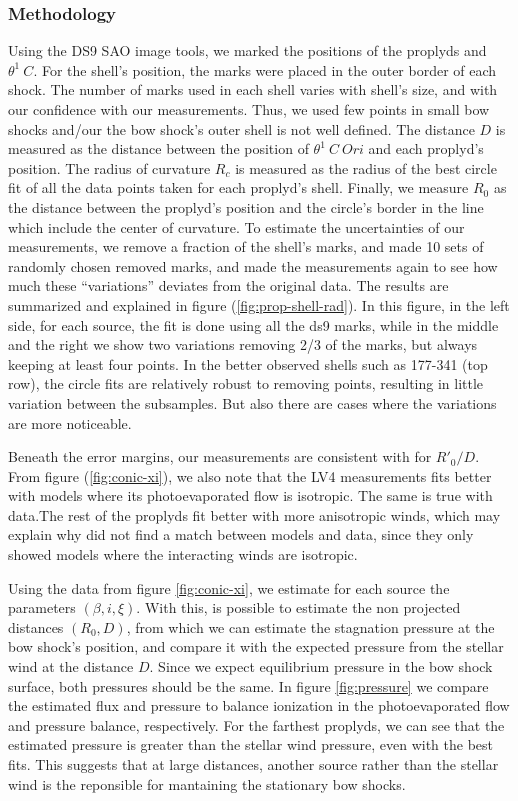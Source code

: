 \subsubsection{Methodology}
\label{sec:methodology}
Using the DS9 SAO image tools, we marked the positions of the proplyds and $\theta^1 ~C$. For the shell's position, the marks were placed in the outer border of each shock. 
The number of marks used in each shell varies with shell's size, and with our confidence with our measurements.
Thus, we used few points in small bow shocks and/our the bow shock's outer shell is not well defined. The distance $D$ is measured as the distance between the position of $\theta^1 ~C~Ori$ 
and each proplyd's position. The radius of curvature $R_c$ is measured as the radius of the 
best circle fit of all the data points taken for each proplyd's shell. Finally, we measure $R_0$ as the distance between the proplyd's position and the circle's border in the line which 
include the center of curvature.
To estimate the uncertainties of our measurements, we remove a fraction of the shell's marks, and made 10 sets of randomly chosen removed marks, and made the measurements again to 
see how much these ``variations'' deviates from the original data. The results are summarized and explained in figure (\ref{fig:prop-shell-rad}).  In this figure, in the left side, for each source, 
the fit is done using all the ds9 marks, while in the middle and the right we show two variations removing 2/3 of the marks, but always keeping at least four points. 
In the better observed shells such as 177-341 (top row), the circle
fits are relatively robust to removing points, resulting in little variation between the subsamples. 
But also there are cases where the variations are more noticeable.

Beneath the error margins, our measurements are consistent with \citet{Robberto:2005} for $R'_0/D$. From figure (\ref{fig:conic-xi}), we also
note that the LV4 measurements fits better with models where its photoevaporated flow is isotropic. The same is true with \citet{Robberto:2005} data.The rest of the proplyds fit better with more anisotropic winds, which may explain why \citet{Robberto:2005} did not find a match between models
and data, since they only showed models where the interacting winds are isotropic.

Using the data from figure \ref{fig:conic-xi}, we estimate for each source the parameters $(\beta,i,\xi)$. With this, is possible to estimate the non projected distances $(R_0,D)$, from which we can estimate the stagnation pressure at the bow shock's position, 
and compare it with the expected pressure from the stellar wind at the distance $D$. Since we expect equilibrium pressure in the bow shock surface, both pressures should be the same. In figure \ref{fig:pressure} we compare the estimated flux and 
pressure to balance ionization in the photoevaporated flow and pressure balance, respectively.  For the farthest proplyds, we can see that the estimated pressure is greater than the stellar wind pressure, even with the best fits. This suggests that at large distances, another source rather than the 
stellar wind is the reponsible for mantaining the stationary bow shocks. 

